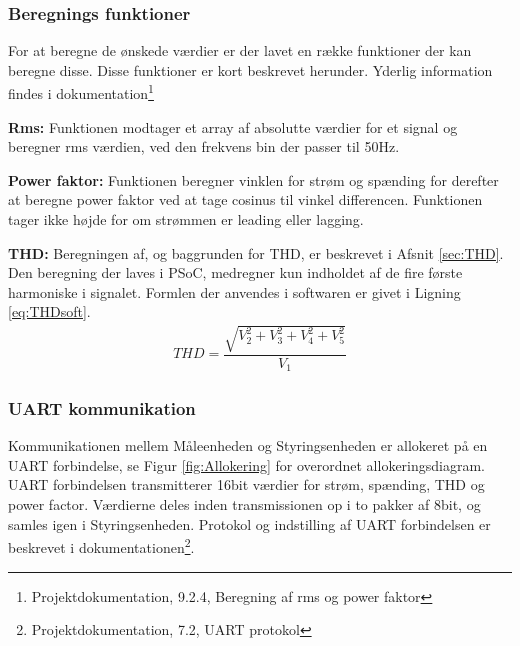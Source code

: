 
\subsubsection{Beregnings funktioner}
For at beregne de ønskede værdier er der lavet en række funktioner der kan beregne disse. Disse funktioner er kort beskrevet herunder. Yderlig information findes i dokumentation\footnote{Projektdokumentation, 9.2.4, Beregning af rms og power faktor}

\textbf{Rms:}
Funktionen modtager et array af absolutte værdier for et signal og beregner rms værdien, ved den frekvens bin der passer til 50Hz.

\textbf{Power faktor:}
Funktionen beregner vinklen for strøm og spænding for derefter at beregne power faktor ved at tage cosinus til vinkel differencen. Funktionen tager ikke højde for om strømmen er leading eller lagging.

\textbf{THD:}
Beregningen af, og baggrunden for THD, er beskrevet i Afsnit \ref{sec:THD}. Den beregning der laves i PSoC, medregner kun indholdet af de fire første harmoniske i signalet. Formlen der anvendes i softwaren er givet i Ligning \ref{eq:THDsoft}.
\begin{align}
\label{eq:THDsoft}
THD = \dfrac{\sqrt{V_2^{2}+V_3^{2}+V_4^{2}+V_5^{2}}}{V_{1}}
\end{align}
 

\subsubsection{UART kommunikation}
Kommunikationen mellem Måleenheden og Styringsenheden er allokeret på en UART forbindelse, se Figur \ref{fig:Allokering} for overordnet allokeringsdiagram. UART forbindelsen transmitterer 16bit værdier for strøm, spænding, THD og power factor. Værdierne deles inden transmissionen op i to pakker af 8bit, og samles igen i Styringsenheden. Protokol og indstilling af UART forbindelsen er beskrevet i dokumentationen\footnote{Projektdokumentation, 7.2, UART protokol}.




